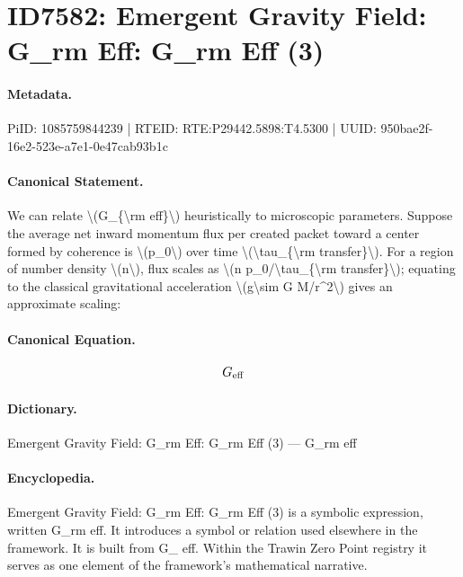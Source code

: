 \section*{ID7582: Emergent Gravity Field: G\_rm Eff: G\_rm Eff (3)}
\paragraph{Metadata.}
PiID: 1085759844239 | RTEID: RTE:P29442.5898:T4.5300 | UUID: 950bae2f-16e2-523e-a7e1-0e47cab93b1c

\paragraph{Canonical Statement.}
We can relate \textbackslash{}(G\_\{\textbackslash{}rm eff\}\textbackslash{}) heuristically to microscopic parameters. Suppose the average net inward momentum flux per created packet toward a center formed by coherence is \textbackslash{}(p\_0\textbackslash{}) over time \textbackslash{}(\textbackslash{}tau\_\{\textbackslash{}rm transfer\}\textbackslash{}). For a region of number density \textbackslash{}(n\textbackslash{}), flux scales as \textbackslash{}(n p\_0/\textbackslash{}tau\_\{\textbackslash{}rm transfer\}\textbackslash{}); equating to the classical gravitational acceleration \textbackslash{}(g\textbackslash{}sim G M/r\textasciicircum{}2\textbackslash{}) gives an approximate scaling:

\paragraph{Canonical Equation.}
\[
G_{\rm eff}
\]

\paragraph{Dictionary.}
Emergent Gravity Field: G\_rm Eff: G\_rm Eff (3) — G\_rm eff

\paragraph{Encyclopedia.}
Emergent Gravity Field: G\_rm Eff: G\_rm Eff (3) is a symbolic expression, written G\_rm eff. It introduces a symbol or relation used elsewhere in the framework. It is built from G\_ eff. Within the Trawin Zero Point registry it serves as one element of the framework's mathematical narrative.
